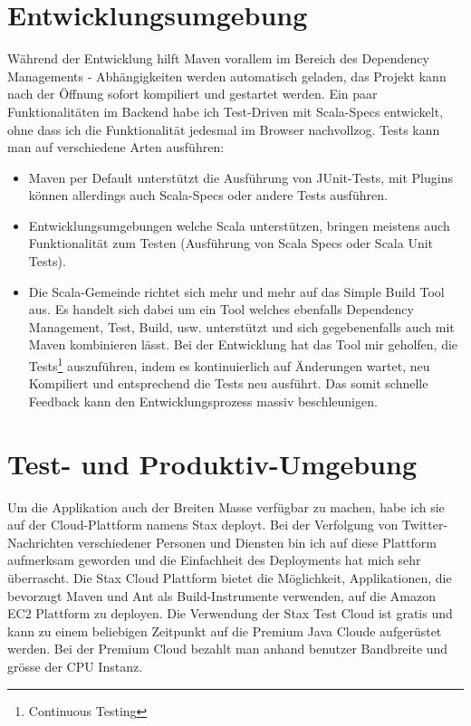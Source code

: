 \section{Entwicklungsumgebung}
W\"ahrend der Entwicklung hilft Maven vorallem im Bereich des Dependency Managements - Abh\"angigkeiten werden automatisch geladen, das Projekt kann nach der \"Offnung sofort kompiliert und gestartet werden. Ein paar Funktionalit\"aten im Backend habe ich Test-Driven mit Scala-Specs entwickelt, ohne dass ich die Funktionalit\"at jedesmal im Browser nachvollzog. Tests kann man auf verschiedene Arten ausf\"uhren:
\begin{itemize}
\item Maven per Default unterst\"utzt die Ausf\"uhrung von JUnit-Tests, mit Plugins k\"onnen allerdings auch Scala-Specs oder andere Tests ausf\"uhren.
\item Entwicklungsumgebungen welche Scala unterst\"utzen, bringen meistens auch Funktionalit\"at zum Testen (Ausf\"uhrung von Scala Specs oder Scala Unit  Tests). 
\item Die Scala-Gemeinde richtet sich mehr und mehr auf das Simple Build Tool\cite{SimpleBuildTool} aus. Es handelt sich dabei um ein Tool welches ebenfalls Dependency Management, Test, Build, usw. unterst\"utzt und sich gegebenenfalls auch mit Maven kombinieren l\"asst. Bei der Entwicklung hat das Tool mir geholfen, die Tests\footnote{Continuous Testing} auszuf\"uhren, indem es kontinuierlich auf \"Anderungen wartet, neu Kompiliert und entsprechend die Tests neu ausf\"uhrt. Das somit schnelle Feedback kann den Entwicklungsprozess massiv beschleunigen.\end{itemize}


\section{Test- und Produktiv-Umgebung}
Um die Applikation auch der Breiten Masse verf\"ugbar zu machen, habe ich sie auf der Cloud-Plattform namens Stax\cite{Stax} deployt. Bei der Verfolgung von Twitter-Nachrichten verschiedener Personen und Diensten bin ich auf diese Plattform aufmerksam geworden und die Einfachheit des Deployments hat mich sehr \"uberrascht.
Die Stax Cloud Plattform\cite{Stax} bietet die M\"oglichkeit, Applikationen, die bevorzugt Maven und Ant als Build-Instrumente verwenden, auf die Amazon EC2 Plattform zu deployen. Die Verwendung der Stax Test Cloud ist gratis und kann zu einem beliebigen Zeitpunkt auf die Premium Java Cloude aufger\"ustet werden. Bei der Premium Cloud bezahlt man anhand benutzer Bandbreite und gr\"osse der CPU Instanz.

